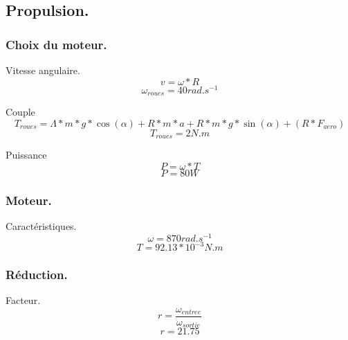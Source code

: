 \subsection{Propulsion.}
\begin{frame}
    \frametitle{Choix du moteur.}
    \begin{block}{Vitesse angulaire.}
        \[ v = \omega * R \]
        \[ \omega_{roues} = 40rad.s^{-1} \]
    \end{block}
     {
        \begin{block}{Couple}
            \[ T_{roues} = \Lambda * m * g * \cos(\alpha) + R * m * a + R * m * g * \sin(\alpha) + \left(R * F_{aero}\right) \]
            \[ T_{roues} = 2 N.m \]
        \end{block}
    }
     {
        \begin{block}{Puissance}
            \[ P = \omega * T \]
            \[ P = 80 W \]
        \end{block}
    }
\end{frame}

\begin{frame}
    \frametitle{Moteur.}
    \begin{exampleblock}{Caractéristiques.}
        \[ \omega = 870 rad.s^{-1} \]
        \[ T = 92.13*10^{-3} N.m \]
    \end{exampleblock}
\end{frame}

\begin{frame}
    \frametitle{Réduction.}
    \begin{block}{Facteur.}
        \[ r = \frac{\omega_{entree}}{\omega_{sortie}} \]
        \[ r = 21.75 \]
    \end{block}
\end{frame}

